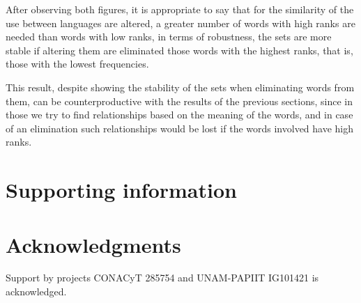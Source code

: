 \documentclass[10pt,letterpaper]{article} %
\begin{document}
After observing both figures, it is appropriate to say that for the similarity of the use between languages are altered, a greater number of words with high ranks are needed than words with low ranks, in terms of robustness, the sets are more stable if altering them are eliminated those words with the highest ranks, that is, those with the lowest frequencies.

This result, despite showing the stability of the sets when eliminating words from them, can be counterproductive with the results of the previous sections, since in those we try to find relationships based on the meaning of the words, and in case of an elimination such relationships would be lost if the words involved have high ranks.


\section*{Supporting information} %
\section*{Acknowledgments} %

\nolinenumbers

Support by projects CONACyT 285754 and UNAM-PAPIIT IG101421 is acknowledged. 
% 
 
\end{document}
